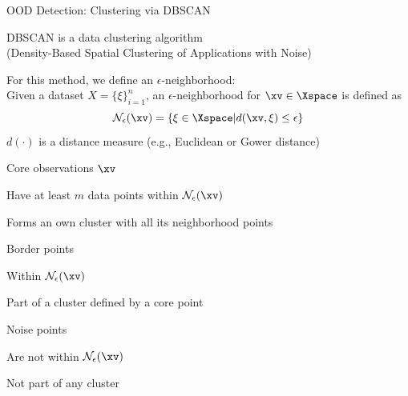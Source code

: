 \documentclass[10pt,compress,t,notes=noshow, xcolor=table]{beamer}
\begin{document}
\begin{framei}[align=top]{OOD Detection: Clustering via DBSCAN}
\item DBSCAN is a data clustering algorithm \\
(Density-Based Spatial Clustering of Applications with Noise)
\pause
\item For this method, we define an $\epsilon$-neighborhood:\\
Given a dataset $X = \{\xi\}_{i = 1}^n$, an $\epsilon$-neighborhood for $\xv \in \Xspace$ is defined as
$$\mathcal{N}_{\epsilon}(\xv) = \{\xi \in \Xspace | d(\xv, \xi) \le \epsilon\}$$
$d(\cdot)$ is a distance measure (e.g., Euclidean or Gower distance)
\pause
\item Core observations $\xv$
\begin{itemizeS}
\item Have at least $m$ data points within $\mathcal{N}_{\epsilon}(\xv)$
\item Forms an own cluster with all its neighborhood points
\end{itemizeS}
\pause
\item Border points
\begin{itemizeS}
\item Within $\mathcal{N}_{\epsilon}(\xv)$
\item Part of a cluster defined by a core point
\end{itemizeS}
\pause
\item Noise points
\begin{itemizeS}
\item Are not within $\mathcal{N}_{\epsilon}(\xv)$
\item Not part of any cluster
\end{itemizeS}
\end{framei}
\end{document}
